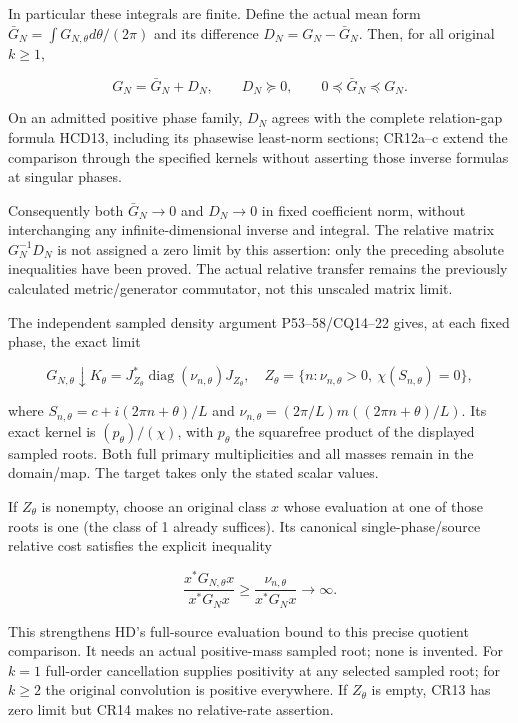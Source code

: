 \documentclass{article}
\begin{document}
In particular these integrals are finite. Define the actual mean form \(\bar G_N=\int G_{N,\theta}d\theta/(2\pi)\) and its difference \(D_N=G_N-\bar G_N\). Then, for all original \(k\ge1\),

\[
G_N=\bar G_N+D_N,\qquad D_N\succeq0,
\qquad 0\preceq\bar G_N\preceq G_N.
\tag{CR12}
\]

On an admitted positive phase family, \(D_N\) agrees with the complete relation-gap formula HCD13, including its phasewise least-norm sections; CR12a--c extend the comparison through the specified kernels without asserting those inverse formulas at singular phases.

Consequently both \(\bar G_N\to0\) and \(D_N\to0\) in fixed coefficient norm, without interchanging any infinite-dimensional inverse and integral. The relative matrix \(G_N^{-1}D_N\) is not assigned a zero limit by this assertion: only the preceding absolute inequalities have been proved. The actual relative transfer remains the previously calculated metric/generator commutator, not this unscaled matrix limit.

The independent sampled density argument P53--58/CQ14--22 gives, at each fixed phase, the exact limit

\[
G_{N,\theta}\downarrow K_\theta
=J_{Z_\theta}^*\operatorname{diag}(\nu_{n,\theta})J_{Z_\theta},
\quad Z_\theta=\{n:\nu_{n,\theta}>0,\ \chi(S_{n,\theta})=0\},
\tag{CR13}
\]

where \(S_{n,\theta}=c+i(2\pi n+\theta)/L\) and \(\nu_{n,\theta}=(2\pi/L)m((2\pi n+\theta)/L)\). Its exact kernel is \((p_\theta)/(\chi)\), with \(p_\theta\) the squarefree product of the displayed sampled roots. Both full primary multiplicities and all masses remain in the domain/map. The target takes only the stated scalar values.

If \(Z_\theta\) is nonempty, choose an original class \(x\) whose evaluation at one of those roots is one (the class of 1 already suffices). Its canonical single-phase/source relative cost satisfies the explicit inequality

\[
\frac{x^*G_{N,\theta}x}{x^*G_Nx}
\ge\frac{\nu_{n,\theta}}{x^*G_Nx}\longrightarrow\infty.
\tag{CR14}
\]

This strengthens HD's full-source evaluation bound to this precise quotient comparison. It needs an actual positive-mass sampled root; none is invented. For \(k=1\) full-order cancellation supplies positivity at any selected sampled root; for \(k\ge2\) the original convolution is positive everywhere. If \(Z_\theta\) is empty, CR13 has zero limit but CR14 makes no relative-rate assertion.
\end{document}
